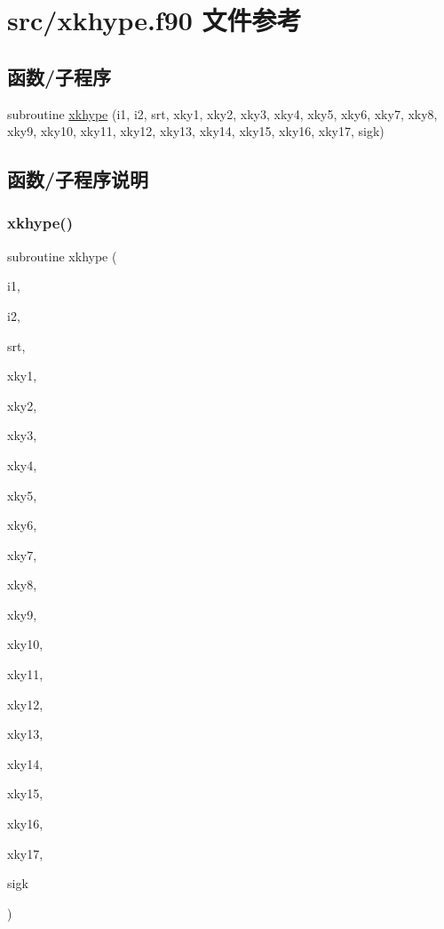 \hypertarget{xkhype_8f90}{}\section{src/xkhype.f90 文件参考}
\label{xkhype_8f90}
\subsection*{函数/子程序}
\begin{DoxyCompactItemize}
\item 
subroutine \mbox{\hyperlink{xkhype_8f90_af8397e9564a0a14c6015e200025d75db}{xkhype}} (i1, i2, srt, xky1, xky2, xky3, xky4, xky5, xky6, xky7, xky8, xky9, xky10, xky11, xky12, xky13, xky14, xky15, xky16, xky17, sigk)
\end{DoxyCompactItemize}


\subsection{函数/子程序说明}
\mbox{\label{xkhype_8f90_af8397e9564a0a14c6015e200025d75db}} 
\subsubsection{\texorpdfstring{xkhype()}{xkhype()}}
{\footnotesize\ttfamily subroutine xkhype (\begin{DoxyParamCaption}\item[{}]{i1,  }\item[{}]{i2,  }\item[{}]{srt,  }\item[{}]{xky1,  }\item[{}]{xky2,  }\item[{}]{xky3,  }\item[{}]{xky4,  }\item[{}]{xky5,  }\item[{}]{xky6,  }\item[{}]{xky7,  }\item[{}]{xky8,  }\item[{}]{xky9,  }\item[{}]{xky10,  }\item[{}]{xky11,  }\item[{}]{xky12,  }\item[{}]{xky13,  }\item[{}]{xky14,  }\item[{}]{xky15,  }\item[{}]{xky16,  }\item[{}]{xky17,  }\item[{}]{sigk }\end{DoxyParamCaption})}



